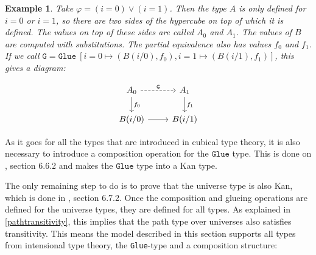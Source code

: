 \documentclass[12pt,a4paper,twoside,xetex]{book}
\newtheorem{example}[theorem]{Example}
\newcommand{\op}[1]{\mathtt{#1}}
\begin{document}
\begin{example}

Take $\varphi = (i=0) \vee (i=1)$. Then the type $A$ is only defined for $i = 0$ or $i =1$, so there are two sides of the hypercube on top of which it is defined. The values on top of these sides are called $A_0$ and $A_1$. The values of $B$ are computed with substitutions. The partial equivalence also has values $f_0$ and $f_1$. If we call $\op{G} = \op{Glue} \  [i = 0 \mapsto (B(i/0),f_0), i=1 \mapsto (B(i/1), f_1)]$, this gives a diagram:

\[ \begin{tikzcd}
A_0 \arrow[r, dashed, "\op{G}" ] \arrow[d, "f_0"]	
& A_1  \arrow[d, "f_1"]  \\
B(i/0) 	
	\arrow[r, ""]
& B(i/1)  
\end{tikzcd}
\]


\end{example}

As it goes for all the types that are introduced in cubical type theory, it is also necessary to introduce a composition operation for the $\op{Glue}$ type. This is done on \cite{Huber2016}, section 6.6.2 and makes the $\op{Glue}$ type into a Kan type.

The only remaining step to do is to prove that the universe type is also Kan, which is done in \cite{Huber2016}, section 6.7.2. Once the composition and glueing operations are defined for the universe types, they are defined for all types. As explained in \cref{pathtransitivity}, this implies that the path type over universes also satisfies transitivity. This means the model described in this section supports all types from intensional type theory, the \texttt{Glue}-type and a composition structure:
\end{document}
